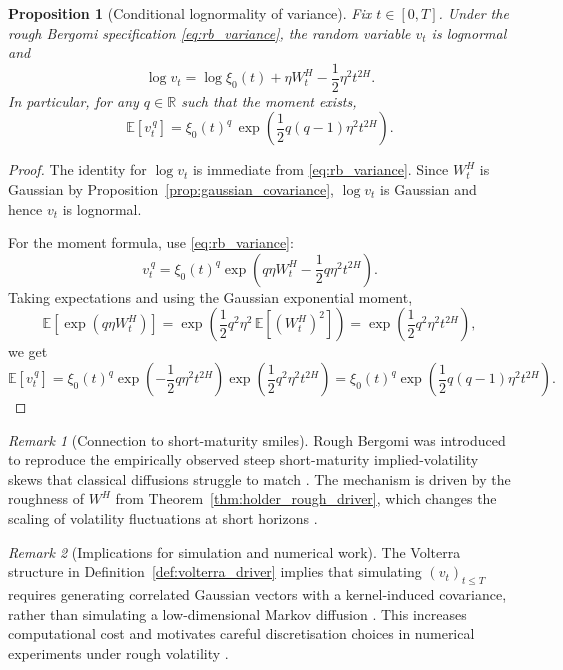 \documentclass[12pt,a4paper]{article}
\theoremstyle{definition}
\theoremstyle{plain}
\newtheorem{proposition}{Proposition}[section]
\theoremstyle{remark}
\newtheorem{remark}{Remark}[section]
\theoremstyle{plain}
\begin{document}
\begin{proposition}[Conditional lognormality of variance]
\label{prop:variance_lognormal}
Fix $t\in[0,T]$. Under the rough Bergomi specification \eqref{eq:rb_variance}, the random variable $v_t$ is lognormal and
\[
    \log v_t
    =
    \log \xi_0(t) + \eta W^H_t - \frac12 \eta^2 t^{2H}.
\]
In particular, for any $q\in\mathbb R$ such that the moment exists,
\[
    \mathbb E[v_t^{\,q}]
    =
    \xi_0(t)^{q}\,
    \exp\!\left(\frac12 q(q-1)\eta^2 t^{2H}\right).
\]
\end{proposition}

\begin{proof}
The identity for $\log v_t$ is immediate from \eqref{eq:rb_variance}. Since $W^H_t$ is Gaussian by Proposition~\ref{prop:gaussian_covariance}, $\log v_t$ is Gaussian and hence $v_t$ is lognormal.

For the moment formula, use \eqref{eq:rb_variance}:
\[
    v_t^{\,q}
    =
    \xi_0(t)^q
    \exp\!\left(q\eta W^H_t - \frac12 q\eta^2 t^{2H}\right).
\]
Taking expectations and using the Gaussian exponential moment,
\[
    \mathbb E\!\left[\exp(q\eta W^H_t)\right]
    =
    \exp\!\left(\frac12 q^2 \eta^2\,\mathbb E[(W^H_t)^2]\right)
    =
    \exp\!\left(\frac12 q^2 \eta^2 t^{2H}\right),
\]
we get
\[
    \mathbb E[v_t^{\,q}]
    =
    \xi_0(t)^q
    \exp\!\left(-\frac12 q\eta^2 t^{2H}\right)
    \exp\!\left(\frac12 q^2\eta^2 t^{2H}\right)
    =
    \xi_0(t)^q \exp\!\left(\frac12 q(q-1)\eta^2 t^{2H}\right).
\]
\end{proof}

\begin{remark}[Connection to short-maturity smiles]
\label{rem:smile_connection}
Rough Bergomi was introduced to reproduce the empirically observed steep short-maturity implied-volatility skews that classical diffusions struggle to match \cite{GatheralRough,BayerFriz2016}. 
The mechanism is driven by the roughness of $W^H$ from Theorem~\ref{thm:holder_rough_driver}, which changes the scaling of volatility fluctuations at short horizons \cite{GatheralRough,BayerFriz2016}.
\end{remark}

\begin{remark}[Implications for simulation and numerical work]
\label{rem:simulation_implications}
The Volterra structure in Definition~\ref{def:volterra_driver} implies that simulating $(v_t)_{t\le T}$ requires generating correlated Gaussian vectors with a kernel-induced covariance, rather than simulating a low-dimensional Markov diffusion \cite{BayerFriz2016}. 
This increases computational cost and motivates careful discretisation choices in numerical experiments under rough volatility \cite{Horvath2021DeepRough}.
\end{remark}
\end{document}
